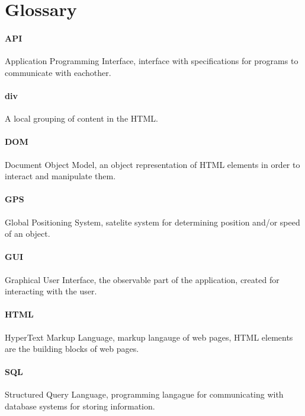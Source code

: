 \section{Glossary}

\paragraph{API} Application Programming Interface, interface with specifications for programs to communicate with eachother.

\paragraph{div} A local grouping of content in the HTML.

\paragraph{DOM} Document Object Model, an object representation of HTML elements in order to interact and manipulate them.

\paragraph{GPS} Global Positioning System, satelite system for determining position and/or speed of an object.

\paragraph{GUI} Graphical User Interface, the observable part of the application, created for interacting with the user.

\paragraph{HTML} HyperText Markup Language, markup langauge of web pages, HTML elements are the building blocks of web pages.

\paragraph{SQL} Structured Query Language, programming langague for communicating with database systems for storing information.
